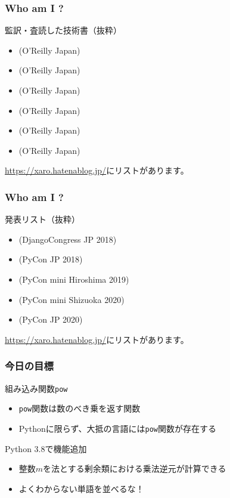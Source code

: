 \documentclass[aspectratio=169,dvipdfmx,14pt,notheorems]{beamer}
\theoremstyle{definition}
\begin{document}
\begin{frame}\frametitle{Who am I ?}

\begin{block}{監訳・査読した技術書（抜粋）}
\begin{itemize}
\item {}(O'Reilly Japan)
\item {}(O'Reilly Japan)
\item {}(O'Reilly Japan)
\item {}(O'Reilly Japan)
\item {}(O'Reilly Japan) 
\item {}(O'Reilly Japan) 
\end{itemize}
\end{block}
\url{https://xaro.hatenablog.jp/}にリストがあります。
\end{frame}

\begin{frame}\frametitle{Who am I ?}

\begin{block}{発表リスト（抜粋）}
\begin{itemize}
\item {}(DjangoCongress JP 2018)
\item {}(PyCon JP 2018)
\item {}(PyCon mini Hiroshima 2019)
\item {}(PyCon mini Shizuoka 2020)
\item {}(PyCon JP 2020)
\end{itemize}
\end{block}
\url{https://xaro.hatenablog.jp/}にリストがあります。
\end{frame}

\begin{frame}\frametitle{今日の目標}

\begin{block}{組み込み関数\texttt{pow}}
\begin{itemize}
\item \texttt{pow}関数は数のべき乗を返す関数
\item Pythonに限らず、大抵の言語には\texttt{pow}関数が存在する
\end{itemize}
\end{block}

\begin{exampleblock}{Python 3.8で機能追加}
\begin{itemize}
\item 整数$m$を法とする剰余類における乗法逆元が計算できる
\item よくわからない単語を並べるな！
\end{itemize}
\end{exampleblock}
\end{frame}
\end{document}
